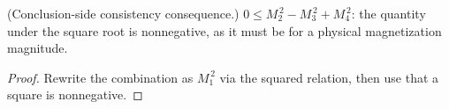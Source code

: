 \begin{theorem}
\label{thm:IPhO2026Problems_problem_IPhO_2026_3_C_2:m1_sq_arg_nonneg}
(Conclusion-side consistency consequence.)
$0 \le M_2^{\,2} - M_3^{\,2} + M_4^{\,2}$: the quantity under the
square root is nonnegative, as it must be for a physical
magnetization magnitude.
\end{theorem}
\begin{proof}
Rewrite the combination as $M_1^{\,2}$ via the squared relation,
then use that a square is nonnegative.
\end{proof}
